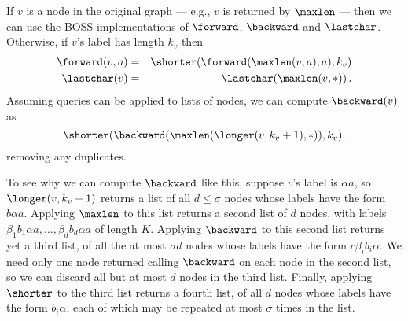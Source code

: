 If $v$ is a node in the original graph --- e.g., $v$ is returned by $\maxlen$ --- then we can use the BOSS implementations of $\forward$, $\backward$ and $\lastchar$.  Otherwise, if $v$'s label has length $k_v$ then
\begin{eqnarray*}
\forward(v, a) & = & \shorter(\forward(\maxlen(v, a), a), k_v)\\
\lastchar(v) & = & \lastchar(\maxlen(v, *))\,.
\end{eqnarray*}
Assuming queries can be applied to lists of nodes, we can compute \(\backward(v)\) as %
\[\shorter(\backward(\maxlen(\longer(v, k_v + 1), *)), k_v),\]
removing any duplicates.

To see why we can compute $\backward$ like this, suppose $v$'s label is \(\alpha a\), so \(\longer(v, \allowbreak k_v + 1)\) returns a list of all \(d \leq \sigma\) nodes whose labels have the form \(b \alpha a\).  Applying $\maxlen$ to this list returns a second list of $d$ nodes, with labels \(\beta_1 b_1 \alpha a, \ldots, \beta_d b_d \alpha a\) of length $K$.  Applying $\backward$ to this second list returns yet a third list, of all the at most \(\sigma d\) nodes whose labels have the form \(c \beta_i b_i \alpha\).  We need only one node returned calling $\backward$ on each node in the second list, so we can discard all but at most $d$ nodes in the third list.  Finally, applying $\shorter$ to the third list returns a fourth list, of all $d$ nodes whose labels have the form \(b_i \alpha\), each of which may be repeated at most $\sigma$ times in the list.


